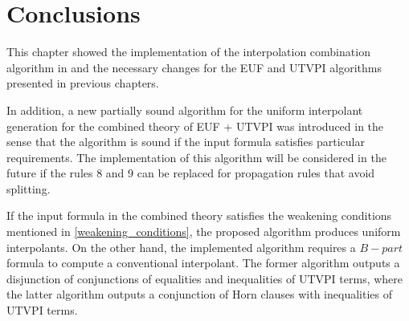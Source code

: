 \section{Conclusions}

This chapter showed the implementation of the
interpolation combination algorithm in 
\cite{10.1007/11532231_26} and the necessary
changes for the EUF and UTVPI algorithms
presented in previous chapters. 

In addition, a new partially sound algorithm 
for the uniform interpolant
generation for the combined theory of EUF + UTVPI 
was introduced in the sense that the algorithm is
sound if the input formula satisfies 
particular requirements. 
The implementation of this algorithm
will be considered in the future if the rules 8 and 9
can be replaced for propagation rules that
avoid splitting. 

If the input formula in the combined theory 
satisfies the weakening conditions mentioned in
\ref{weakening_conditions}, the proposed algorithm 
produces uniform interpolants. On the other hand,
the implemented algorithm requires a $B-part$
formula to compute a conventional interpolant.
The former algorithm outputs 
a disjunction of conjunctions of equalities 
and inequalities of UTVPI terms, where the 
latter algorithm outputs
a conjunction of Horn clauses with inequalities of
UTVPI terms.

